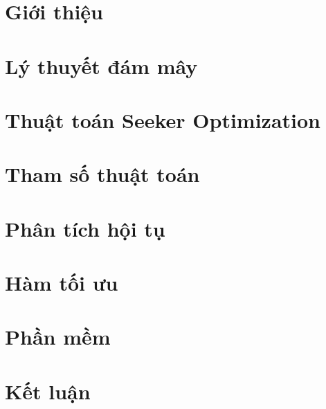 \documentclass[12pt,a4paper]{report}
\begin{document}
 

\tableofcontents

 
\chapter{Giới thiệu}

\chapter{Lý thuyết đám mây}

\chapter{Thuật toán Seeker Optimization}

\chapter{Tham số thuật toán}

\chapter{Phân tích hội tụ}

\chapter{Hàm tối ưu}

\chapter{Phần mềm }

\chapter*{Kết luận}
\indent
\thispagestyle{fancy}

\nocite{*}


\end{document}

